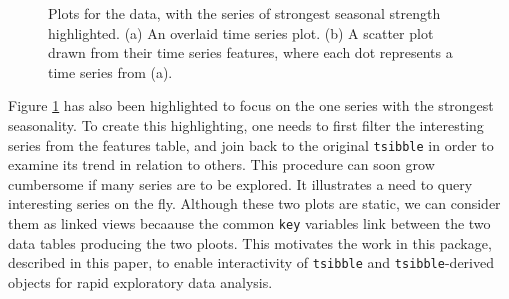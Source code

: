 \begin{Schunk}
\begin{figure}

{\centering {}

}

\caption[Plots for the  data, with the series of strongest seasonal strength highlighted]{Plots for the  data, with the series of strongest seasonal strength highlighted. (a) An overlaid time series plot. (b) A scatter plot drawn from their time series features, where each dot represents a time series from (a).}\label{fig:highlight-retail}
\end{figure}
\end{Schunk}

Figure \ref{fig:highlight-retail} has also been highlighted to focus on
the one series with the strongest seasonality. To create this
highlighting, one needs to first filter the interesting series from the
features table, and join back to the original \texttt{tsibble} in order
to examine its trend in relation to others. This procedure can soon grow
cumbersome if many series are to be explored. It illustrates a need to
query interesting series on the fly. Although these two plots are
static, we can consider them as linked views becaause the common
\texttt{key} variables link between the two data tables producing the
two ploots. This motivates the work in this package, described in this
paper, to enable interactivity of \texttt{tsibble} and
\texttt{tsibble}-derived objects for rapid exploratory data analysis.


